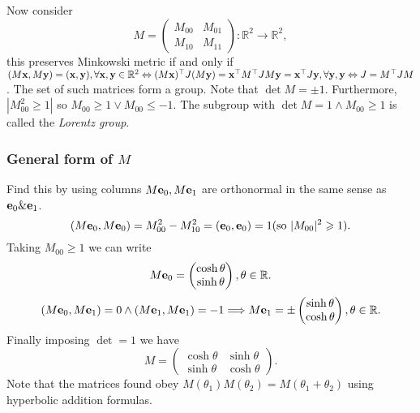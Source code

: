 \documentclass[10pt]{article}
\def\le{\leqslant}
\def\ge{\geqslant}
\begin{document}
    Now consider 
    \[
        M=\begin{pmatrix}
            M_{00}&M_{01}\\
            M_{10}&M_{11}
        \end{pmatrix}: \mathbb{R}^{2}\to \mathbb{R}^{2},
    \]
    this preserves Minkowski metric if and only if $ (M{\bf x}, M{\bf y})=({\bf x},{\bf y}),\forall {\bf x},{\bf y}\in \mathbb{R}^{2} \Leftrightarrow (M{\bf x})^{\top }J(M{\bf y})={\bf x}^\top M^\top JM{\bf y} = {\bf x}^\top J {\bf y},\forall {\bf y},{\bf y} \Leftrightarrow J=M^\top JM $. The set of such matrices form a group. Note that $ \det M=\pm 1 $. Furthermore, $ |M_{00}^2\ge 1| $ so $ M_{00}\ge 1 \lor M_{00}\le -1 $. The subgroup with $ \det M=1 \land M_{00}\ge 1 $ is called the \textit{Lorentz group}.
    \subsubsection*{General form of $M$}
    Find this by using columns $ M{\bf e}_0,M{\bf e}_1 $ are orthonormal in the same sense as $ {\bf e}_0\&{\bf e}_1 $. 
    \[
        (M\bfe_0,M\bfe_0)=M_{00}^2-M_{10}^2=(\bfe_0,\bfe_0)=1(\text{so } |M_{00}|^2\ge 1).
    \]
    Taking $ M_{00}\ge 1 $ we can write
    \[
        M{\bf e}_0=\begin{pmatrix}
            \cosh \theta\\ \sinh \theta
        \end{pmatrix},\theta\in \mathbb{R}.
    \]
    \[
        (M{\bf e}_0,M{\bf e}_1)=0 \land (M{\bf e}_1,M{\bf e}_1)=-1 \Longrightarrow M{\bf e}_1 = \pm \begin{pmatrix}
            \sinh \theta\\ \cosh \theta
        \end{pmatrix},\theta\in \mathbb{R}.
    \]
    Finally imposing $\det=1$ we have 
    \[
        M=\begin{pmatrix}
            \cosh \theta & \sinh \theta\\
            \sinh \theta & \cosh \theta
        \end{pmatrix}.
    \]
    Note that the matrices found obey $ M(\theta_1)M(\theta_2)=M(\theta_1+\theta_2) $ using hyperbolic addition formulas.
\end{document}
